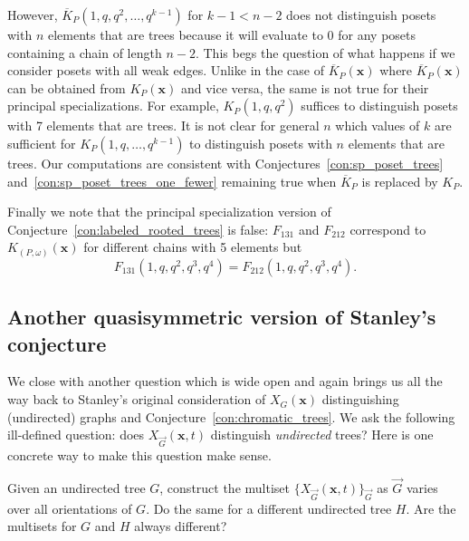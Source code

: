 \documentclass[ALCO,Unicode,published]{cedram}
\newcommand{\diG}{\overrightarrow{G}}
\newcommand{\x}{\mathbf{x}}
\newcommand{\om}{\omega}
\newcommand{\KK}[1]{\overline{K}_{#1}}
\newcommand{\kpw}{K_{(P,\om)}}
\begin{document}
However, $\KK{P}(1, q, q^2, \ldots, q^{k-1})$ for $k-1<n-2$ does not distinguish posets with $n$ elements that are trees because it will evaluate to 0 for any posets containing a chain of length $n-2$.  This begs the question of what happens if we consider posets with all weak edges.  Unlike in the case of $\KK{P}(\x)$ where $\KK{P}(\x)$ can be obtained from $K_P(\x)$ and vice versa, the same is not true for their principal specializations.  For example, $K_P(1,q,q^2)$ suffices to distinguish posets with 7 elements that are trees.  It is not clear for general $n$ which values of $k$ are sufficient for $K_P(1,q,\ldots,q^{k-1})$  to distinguish posets with $n$ elements that are trees.  Our computations are consistent with Conjectures~\ref{con:sp_poset_trees} and~\ref{con:sp_poset_trees_one_fewer} remaining true when $\KK{P}$ is replaced by $K_P$.

Finally we note that the principal specialization version of Conjecture~\ref{con:labeled_rooted_trees} is false: $F_{131}$ and $F_{212}$ correspond to $\kpw(\x)$ for different chains with 5 elements but 
\[
F_{131}(1,q,q^2,q^3,q^4) = F_{212}(1,q,q^2,q^3,q^4).  
\]

\subsection{Another quasisymmetric version of Stanley's conjecture}

We close with another question which is wide open and again brings us all the way back to Stanley's original consideration of $X_G(\x)$ distinguishing (undirected) graphs and Conjecture~\ref{con:chromatic_trees}.  We ask the following ill-defined question: does $X_{\diG}(\x, t)$ distinguish \emph{undirected} trees? Here is one concrete way to make this question make sense.

\begin{question}
Given an undirected tree $G$, construct the multiset $\{X_{\diG} (\mathbf{x}, t)\}_{\diG}$ as $\diG$ varies over all orientations of $G$. Do the same for a different undirected tree $H$. Are the multisets for $G$ and $H$ always different?
\end{question}




\end{document}
